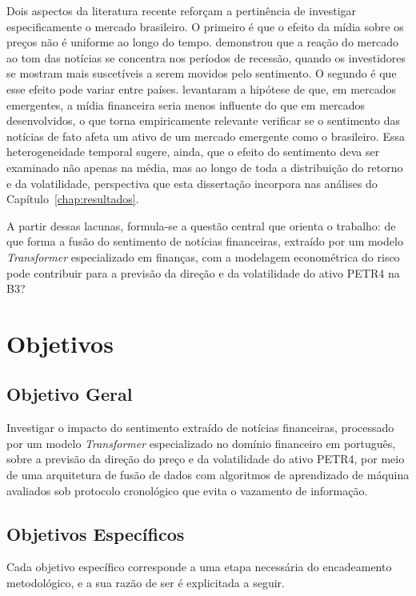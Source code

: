 Dois aspectos da literatura recente reforçam a pertinência de investigar especificamente o mercado brasileiro. O primeiro é que o efeito da mídia sobre os preços não é uniforme ao longo do tempo.  demonstrou que a reação do mercado ao tom das notícias se concentra nos períodos de recessão, quando os investidores se mostram mais suscetíveis a serem movidos pelo sentimento. O segundo é que esse efeito pode variar entre países.  levantaram a hipótese de que, em mercados emergentes, a mídia financeira seria menos influente do que em mercados desenvolvidos, o que torna empiricamente relevante verificar se o sentimento das notícias de fato afeta um ativo de um mercado emergente como o brasileiro. Essa heterogeneidade temporal sugere, ainda, que o efeito do sentimento deva ser examinado não apenas na média, mas ao longo de toda a distribuição do retorno e da volatilidade, perspectiva que esta dissertação incorpora nas análises do Capítulo~\ref{chap:resultados}.

A partir dessas lacunas, formula-se a questão central que orienta o trabalho: de que forma a fusão do sentimento de notícias financeiras, extraído por um modelo \textit{Transformer} especializado em finanças, com a modelagem econométrica do risco pode contribuir para a previsão da direção e da volatilidade do ativo PETR4 na B3?

\section{Objetivos}

\subsection{Objetivo Geral}
Investigar o impacto do sentimento extraído de notícias financeiras, processado por um modelo \textit{Transformer} especializado no domínio financeiro em português, sobre a previsão da direção do preço e da volatilidade do ativo PETR4, por meio de uma arquitetura de fusão de dados com algoritmos de aprendizado de máquina avaliados sob protocolo cronológico que evita o vazamento de informação.

\subsection{Objetivos Específicos}
Cada objetivo específico corresponde a uma etapa necessária do encadeamento metodológico, e a sua razão de ser é explicitada a seguir.

